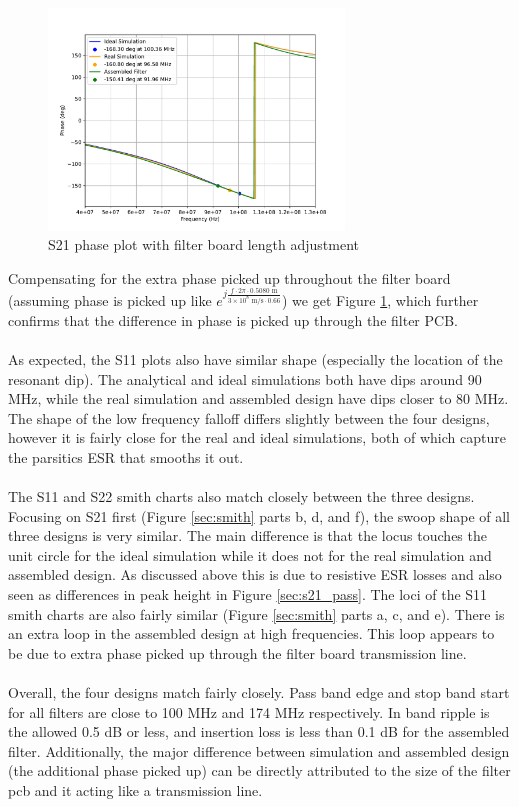 \documentclass[letterpaper,12pt]{article}
\begin{document}
\begin{figure}[H]
  \centering \includegraphics[width=0.7\textwidth]{figures/9.phase_fixed.pdf}
  \caption{S21 phase plot with filter board length adjustment \label{fig:9.phase_fixed}}
\end{figure}
\noindent
Compensating for the extra phase picked up throughout the filter board (assuming phase is picked up like $e^{j\frac{f\cdot 2\pi \cdot 0.5080 \text{ m}}{3\times 10^8 \text{ m/s} \cdot 0.66}}$) we get Figure \ref{fig:9.phase_fixed}, which further confirms that the difference in phase is picked up through the filter PCB.
\\
\\
As expected, the S11 plots also have similar shape (especially the location of the resonant dip). The analytical and ideal simulations both have dips around 90 MHz, while the real simulation and assembled design have dips closer to 80 MHz. The shape of the low frequency falloff differs slightly between the four designs, however it is fairly close for the real and ideal simulations, both of which capture the parsitics ESR that smooths it out.
\\
\\
The S11 and S22 smith charts also match closely between the three designs. Focusing on S21 first (Figure \ref{sec:smith} parts b, d, and f), the swoop shape of all three designs is very similar. The main difference is that the locus touches the unit circle for the ideal simulation while it does not for the real simulation and assembled design. As discussed above this is due to resistive ESR losses and also seen as differences in peak height in Figure \ref{sec:s21_pass}. The loci of the S11 smith charts are also fairly similar (Figure \ref{sec:smith} parts a, c, and e). There is an extra loop in the assembled design at high frequencies. This loop appears to be due to extra phase picked up through the filter board transmission line.
\\
\\
Overall, the four designs match fairly closely. Pass band edge and stop band start for all filters are close to 100 MHz and 174 MHz respectively. In band ripple is the allowed 0.5 dB or less, and insertion loss is less than 0.1 dB for the assembled filter. Additionally, the major difference between simulation and assembled design (the additional phase picked up) can be directly attributed to the size of the filter pcb and it acting like a transmission line.
\end{document}
